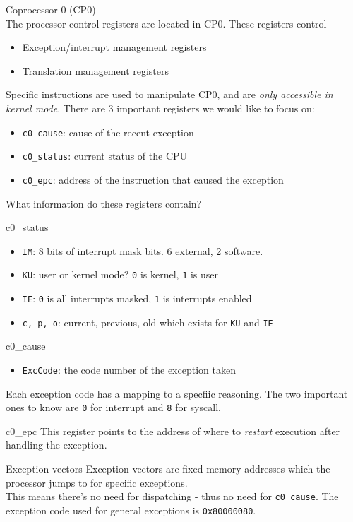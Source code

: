 \documentclass[journal, letterpaper]{IEEEtran}
\begin{document}
\begin{theory}{Coprocessor 0 (CP0)} \\ 
    The processor control registers are located in CP0. These registers control
    \begin{itemize}
        \item Exception/interrupt management registers
        \item Translation management registers
    \end{itemize}
    Specific instructions are used to manipulate CP0, and are \textit{only accessible in kernel mode}. There are 3 important registers we would like to focus on:
    \begin{itemize}
        \item \verb|c0_cause|: cause of the recent exception
        \item \verb|c0_status|: current status of the CPU
        \item \verb|c0_epc|: address of the instruction that caused the exception
    \end{itemize}
    What information do these registers contain?
    \begin{aside}{c0\_status}
        \begin{itemize}
            \item \verb|IM|: 8 bits of interrupt mask bits. 6 external, 2 software.
            \item \verb|KU|: user or kernel mode? \verb|0| is kernel, \verb|1| is user
            \item \verb|IE|: \verb|0| is all interrupts masked, \verb|1| is interrupts enabled
            \item \verb|c, p, o|: current, previous, old which exists for \verb|KU| and \verb|IE|
        \end{itemize}
    \end{aside}
    \begin{aside}{c0\_cause} 
        \begin{itemize}
            \item \verb|ExcCode|: the code number of the exception taken
        \end{itemize}
        Each exception code has a mapping to a specfiic reasoning. The two important ones to know are \verb|0| for interrupt and \verb|8| for syscall.
    \end{aside}
    \begin{aside}{c0\_epc}
        This register points to the address of where to \textit{restart} execution after handling the exception.
    \end{aside}
    \begin{aside}{Exception vectors}
        Exception vectors are fixed memory addresses which the processor jumps to for specific exceptions.
        \newline \\ 
        This means there's no need for dispatching - thus no need for \verb|c0_cause|. The exception code used for general exceptions is \verb|0x80000080|.
    \end{aside}
\end{theory}
\end{document}
